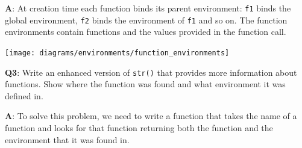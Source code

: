 \documentclass[
]{krantz}
\begin{document}
\textbf{{A}}: At creation time each function binds its parent environment: \texttt{f1} binds the global environment, \texttt{f2} binds the environment of \texttt{f1} and so on. The function environments contain functions and the values provided in the function call.

\begin{center}\texttt{[image: diagrams/environments/function\_environments]} \end{center}

\textbf{{Q3}}: Write an enhanced version of \texttt{str()} that provides more information about functions. Show where the function was found and what environment it was defined in.

\textbf{{A}}: To solve this problem, we need to write a function that takes the name of a function and looks for that function returning both the function and the environment that it was found in.
\end{document}
